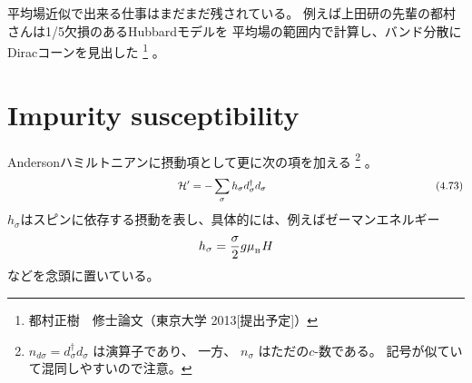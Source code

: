 \documentclass[a4j]{jarticle}
\begin{document}
平均場近似で出来る仕事はまだまだ残されている。
例えば上田研の先輩の都村さんは1/5欠損のあるHubbardモデルを
平均場の範囲内で計算し、バンド分散にDiracコーンを見出した
\footnote{
	都村正樹　修士論文（東京大学 2013[提出予定]）
}
。

\section*{Impurity susceptibility}

Andersonハミルトニアンに摂動項として更に次の項を加える
\footnote{
	$n_{d \sigma}=d_{\sigma}^{\dagger}
		d_{\sigma}$
	は演算子であり、
	一方、
	$n_{\sigma}$
	はただの$c$-数である。
	記号が似ていて混同しやすいので注意。
}
。
\begin{align}
	\hspace{55.5mm}
	\mathcal{H}'= - \sum_{\sigma}
	h_{\sigma}
	d_{\sigma}^{\dagger}
	d_{\sigma}
	\nonumber
	\hspace{55.5mm}
	(4.73)
\end{align}
$h_{\sigma}$はスピンに依存する摂動を表し、具体的には、例えばゼーマンエネルギー
\begin{align}
	h_{\sigma}
	=
	\frac{\sigma}{2}
	g
	\mu_{{}_{\rm B}}
	H
\end{align}
などを念頭に置いている。
\end{document}
